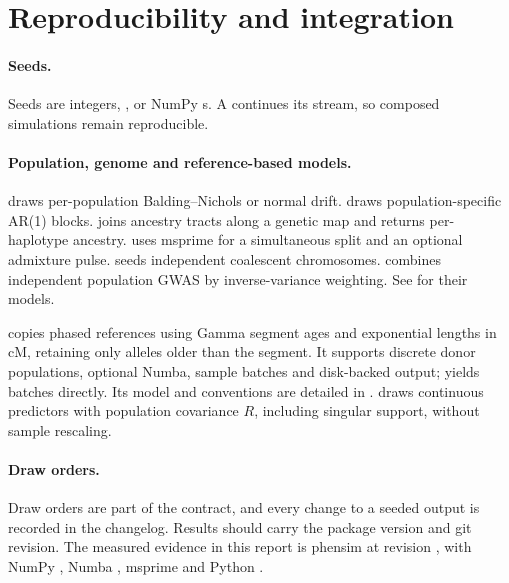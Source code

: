 \documentclass[11pt,a4paper]{article}
\begin{document}
\section{Reproducibility and integration}
\paragraph{Seeds.}
Seeds are integers, , or NumPy s. A
 continues its stream, so composed simulations remain
reproducible.

\paragraph{Population, genome and reference-based models.}
 draws per-population Balding--Nichols or normal
drift.  draws population-specific AR(1) blocks.
 joins ancestry tracts along a genetic map and
returns per-haplotype ancestry.  uses
msprime for a simultaneous split and an optional admixture pulse.
 seeds independent coalescent chromosomes.
 combines independent population GWAS by
inverse-variance weighting. See  for their models.

 copies phased references using Gamma segment ages
and exponential lengths in cM, retaining only alleles older than the segment.
It supports discrete donor populations, optional Numba, sample batches and
disk-backed output;  yields batches directly. Its model
and conventions are detailed in .
 draws continuous predictors with
population covariance $R$, including singular support, without sample rescaling.

\paragraph{Draw orders.}
Draw orders are part of the contract, and every change to a seeded output
is recorded in the changelog. Results should carry the package version
and git revision. The measured evidence in this report is phensim \PhVersion{} at
revision \texttt{\PhRevision}, with NumPy \PhNumpy, Numba \PhNumba,
msprime \PhMsprime{} and Python \PhPython.
\end{document}
